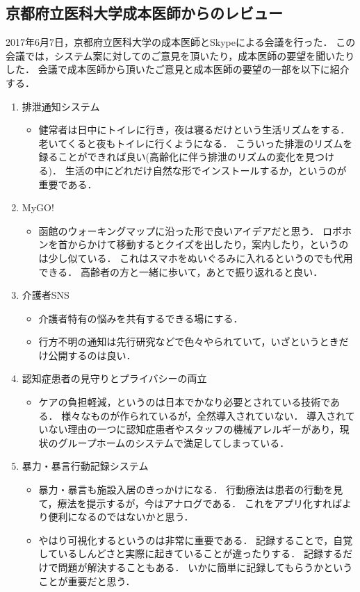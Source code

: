 \documentclass[../report]{subfiles}
\begin{document}
\subsection{京都府立医科大学成本医師からのレビュー}  \label{sec:4_hyouka_before3}
2017年6月7日，京都府立医科大学の成本医師とSkypeによる会議を行った．
この会議では，システム案に対してのご意見を頂いたり，成本医師の要望を聞いたりした．
会議で成本医師から頂いたご意見と成本医師の要望の一部を以下に紹介する．

\begin{enumerate}
    \item[] 排泄通知システム
\begin{itemize}
    \item 健常者は日中にトイレに行き，夜は寝るだけという生活リズムをする．
老いてくると夜もトイレに行くようになる．
こういった排泄のリズムを録ることができれば良い(高齢化に伴う排泄のリズムの変化を見つける)．
生活の中にどれだけ自然な形でインストールするか，というのが重要である．
\end{itemize}

    \item[] MyGO!
\begin{itemize}
    \item 函館のウォーキングマップに沿った形で良いアイデアだと思う．
ロボホンを首からかけて移動するとクイズを出したり，案内したり，というのは少し似ている．
これはスマホをぬいぐるみに入れるというのでも代用できる．
高齢者の方と一緒に歩いて，あとで振り返れると良い．
\end{itemize}

    \item[] 介護者SNS
\begin{itemize}
    \item 介護者特有の悩みを共有するできる場にする．
    \item 行方不明の通知は先行研究などで色々やられていて，いざというときだけ公開するのは良い．
\end{itemize}

    \item[] 認知症患者の見守りとプライバシーの両立
\begin{itemize}
    \item ケアの負担軽減，というのは日本でかなり必要とされている技術である．
様々なものが作られているが，全然導入されていない．
導入されていない理由の一つに認知症患者やスタッフの機械アレルギーがあり，現状のグループホームのシステムで満足してしまっている．
\end{itemize}

    \item[] 暴力・暴言行動記録システム
\begin{itemize}
    \item 暴力・暴言も施設入居のきっかけになる．
行動療法は患者の行動を見て，療法を提示するが，今はアナログである．
これをアプリ化すればより便利になるのではないかと思う．
    \item やはり可視化するというのは非常に重要である．
記録することで，自覚しているしんどさと実際に起きていることが違ったりする．
記録するだけで問題が解決することもある．
いかに簡単に記録してもらうかということが重要だと思う．
\end{itemize}


\end{enumerate}
\end{document}
